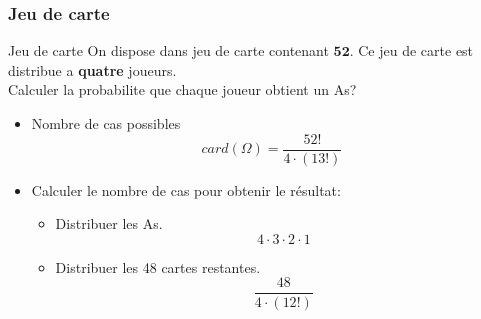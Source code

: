 \documentclass{beamer}
\begin{document}
\begin{frame}[t]
  \frametitle{Jeu de carte}
  
  \begin{block}{Jeu de carte}
  \small
  On dispose dans jeu de carte contenant \alert{$\mathbf{52}$}. Ce jeu de carte
  est distribue a \textbf{quatre} joueurs.\\[8pt]

  \alert{Calculer la probabilite que chaque joueur obtient un As}?
    
  \end{block}
  \pause
    \begin{itemize}
      \scriptsize
      \item  Nombre de cas possibles
      $$
      card(\Omega) = \dfrac{52!}{4\cdot (13!)}
      $$
      \pause
    \item Calculer le nombre de cas pour obtenir le résultat: 
      \begin{itemize}
        \scriptsize
        \item Distribuer les As.
          \pause
          $$
          4\cdot 3 \cdot 2 \cdot 1
          $$
          \pause
        \item Distribuer les 48 cartes restantes.
          \pause
          $$
          \dfrac{48}{4\cdot(12!)}
          $$
      \end{itemize}
    \end{itemize}
\end{frame}
\end{document}
